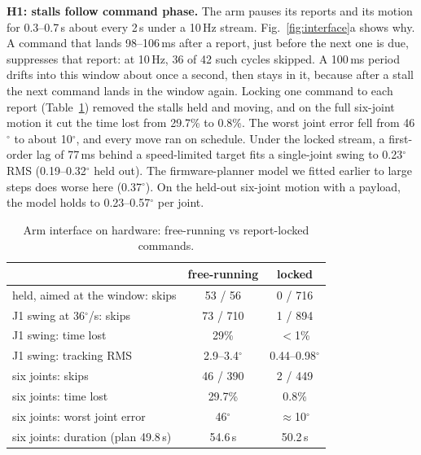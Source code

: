 \documentclass[conference]{IEEEtran}
\newcommand{\hyp}[1]{\textbf{H#1}}
\begin{document}
\textbf{\hyp{1}: stalls follow command phase.} The arm pauses its reports and its motion for 0.3--0.7\,s about every 2\,s
under a 10\,Hz stream. Fig.~\ref{fig:interface}a shows why. A command that lands 98--106\,ms after a report, just before
the next one is due, suppresses that report: at 10\,Hz, 36 of 42 such cycles skipped. A 100\,ms period drifts into this
window about once a second, then stays in it, because after a stall the next command lands in the window again. Locking
one command to each report (Table~\ref{tab:arm}) removed the stalls held and moving, and on the full six-joint motion
it cut the time lost from 29.7\% to 0.8\%. The worst joint error fell from 46$^\circ$ to about 10$^\circ$, and every
move ran on schedule. Under the locked stream, a first-order lag of 77\,ms behind a speed-limited target fits a
single-joint swing to 0.23$^\circ$ RMS (0.19--0.32$^\circ$ held out). The firmware-planner model we fitted earlier to large
steps does worse here (0.37$^\circ$). On the held-out six-joint motion with a payload, the model holds to
0.23--0.57$^\circ$ per joint.

\begin{table}[t]
\centering
\caption{Arm interface on hardware: free-running vs report-locked commands.}
\label{tab:arm}
\footnotesize
\setlength{\tabcolsep}{3pt}
\begin{tabular}{@{}lcc@{}}
\toprule
 & free-running & locked \\
\midrule
held, aimed at the window: skips & 53 / 56 & 0 / 716 \\
J1 swing at 36$^\circ$/s: skips & 73 / 710 & 1 / 894 \\
J1 swing: time lost & 29\% & $<$1\% \\
J1 swing: tracking RMS & 2.9--3.4$^\circ$ & 0.44--0.98$^\circ$ \\
six joints: skips & 46 / 390 & 2 / 449 \\
six joints: time lost & 29.7\% & 0.8\% \\
six joints: worst joint error & 46$^\circ$ & $\approx$10$^\circ$ \\
six joints: duration (plan 49.8\,s) & 54.6\,s & 50.2\,s \\
\bottomrule
\end{tabular}
\end{table}
\end{document}
